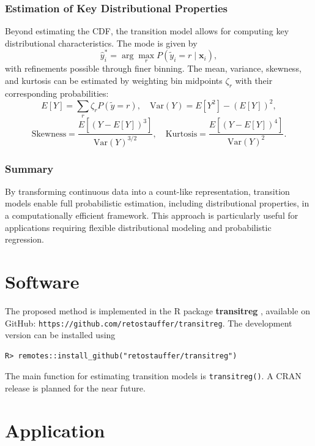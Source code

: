 \documentclass[english,a4paper,11pt]{article}
\begin{document}
\subsubsection{Estimation of Key Distributional Properties}

Beyond estimating the CDF, the transition model allows for computing key
distributional characteristics. The mode is given by
$$
\hat{y}_i^* = \arg\max_r P(\tilde{y}_i = r \mid \mathbf{x}_i),
$$
with refinements possible through finer binning. The mean, variance, skewness, and kurtosis
can be estimated by weighting bin midpoints $\zeta_r$ with their corresponding probabilities:
$$
E[Y] = \sum_{r} \zeta_r P(\tilde{y} = r), \quad \text{Var}(Y) = E[Y^2] - (E[Y])^2,
$$
$$
\text{Skewness} = \frac{E[(Y - E[Y])^3]}{\text{Var}(Y)^{3/2}}, \quad \text{Kurtosis} = \frac{E[(Y - E[Y])^4]}{\text{Var}(Y)^2}.
$$

\subsubsection{Summary}

By transforming continuous data into a count-like representation, transition models enable
full probabilistic estimation, including distributional properties, in a computationally
efficient framework. This approach is particularly useful for applications requiring flexible
distributional modeling and probabilistic regression.

\section{Software} \label{sec:software}

The proposed method is implemented in the \textsf{R} package \textbf{transitreg} \cite{transitreg},
available on GitHub: \texttt{https://github.com/retostauffer/transitreg}. The development version
can be installed using
\begin{verbatim}
R> remotes::install_github("retostauffer/transitreg")
\end{verbatim}  
The main function for estimating transition models is \texttt{transitreg()}. A CRAN release is
planned for the near future.

\section{Application} \label{sec:application}
\end{document}
